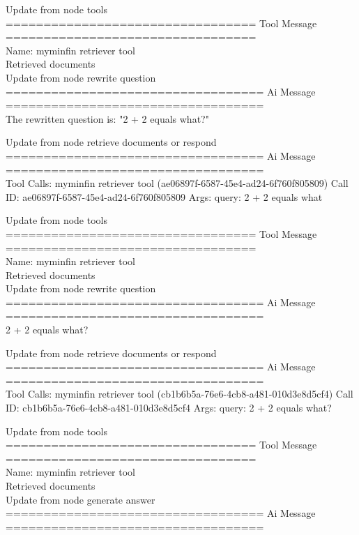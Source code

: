 Update from node tools
\\[1em]
================================= Tool Message =================================
\\[1em]
Name: myminfin  retriever  tool
\\[1em]
Retrieved documents
\\[1em]


Update from node rewrite  question
\\[1em]
================================== Ai Message ==================================
\\[1em]

The rewritten question is:
"2 + 2 equals what?"



Update from node retrieve  documents  or  respond
\\[1em]
================================== Ai Message ==================================
\\[1em]
Tool Calls:
myminfin  retriever  tool (ae06897f-6587-45e4-ad24-6f760f805809)
Call ID: ae06897f-6587-45e4-ad24-6f760f805809
Args:
query: 2 + 2 equals what



Update from node tools
\\[1em]
================================= Tool Message =================================
\\[1em]
Name: myminfin  retriever  tool
\\[1em]
Retrieved documents
\\[1em]
Update from node rewrite  question
\\[1em]
================================== Ai Message ==================================
\\[1em]

2 + 2 equals what?



Update from node retrieve  documents  or  respond
\\[1em]
================================== Ai Message ==================================
\\[1em]
Tool Calls:
myminfin  retriever  tool (cb1b6b5a-76e6-4cb8-a481-010d3e8d5cf4)
Call ID: cb1b6b5a-76e6-4cb8-a481-010d3e8d5cf4
Args:
query: 2 + 2 equals what?



Update from node tools
\\[1em]
================================= Tool Message =================================
\\[1em]
Name: myminfin  retriever  tool
\\[1em]
Retrieved documents
\\[1em]
Update from node generate  answer
\\[1em]
================================== Ai Message ==================================
\\[1em]


